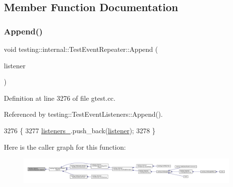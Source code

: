 \subsection{Member Function Documentation}
\mbox{\label{classtesting_1_1internal_1_1TestEventRepeater_ad154ce021881721a5c46994316b14cb1}} 
\subsubsection{\texorpdfstring{Append()}{Append()}}
{\footnotesize\ttfamily void testing\+::internal\+::\+Test\+Event\+Repeater\+::\+Append (\begin{DoxyParamCaption}\item[{\hyperlink{classtesting_1_1TestEventListener}{Test\+Event\+Listener} $\ast$}]{listener }\end{DoxyParamCaption})}



Definition at line 3276 of file gtest.\+cc.



Referenced by testing\+::\+Test\+Event\+Listeners\+::\+Append().


\begin{DoxyCode}
3276                                                           \{
3277   \hyperlink{classtesting_1_1internal_1_1TestEventRepeater_a1c08e9302639108588d764b671c54825}{listeners\_}.push\_back(\hyperlink{namespaceinteractive__marker_a0e579ab555212bb5e2c9f8a675b7618a}{listener});
3278 \}
\end{DoxyCode}
Here is the caller graph for this function\+:
\nopagebreak
\begin{figure}[H]
\begin{center}
\leavevmode
\includegraphics[width=350pt]{classtesting_1_1internal_1_1TestEventRepeater_ad154ce021881721a5c46994316b14cb1_icgraph}
\end{center}
\end{figure}
\mbox{\label{classtesting_1_1internal_1_1TestEventRepeater_abaf2bfc453fc0e1005fcfb0f95deac4c}} 
